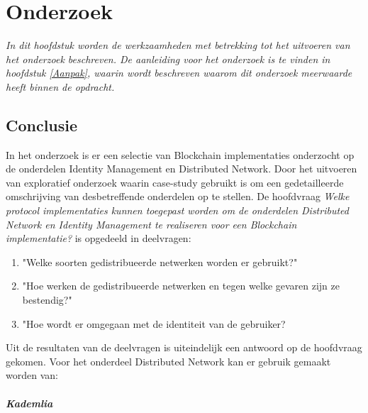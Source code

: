 \chapter{Onderzoek}
\textit{In dit hoofdstuk worden de werkzaamheden met betrekking tot het uitvoeren van het onderzoek beschreven. De aanleiding voor het onderzoek is te vinden in hoofdstuk \ref{Aanpak}, waarin wordt beschreven waarom dit onderzoek meerwaarde heeft binnen de opdracht.}



\newpage


\newpage


\newpage


\newpage


\newpage
\section{Conclusie}

In het onderzoek is er een selectie van Blockchain implementaties onderzocht op de onderdelen Identity Management en Distributed Network. Door het uitvoeren van exploratief onderzoek waarin case-study gebruikt is om een gedetailleerde omschrijving van desbetreffende onderdelen op te stellen. De hoofdvraag \textit{Welke protocol implementaties kunnen toegepast worden om de onderdelen Distributed Network en Identity Management te realiseren voor een Blockchain implementatie?} is opgedeeld in deelvragen:

\begin{enumerate}[noitemsep]
  \item "Welke soorten gedistribueerde netwerken worden er gebruikt?"
  \item "Hoe werken de gedistribueerde netwerken en tegen welke gevaren zijn ze bestendig?"
  \item "Hoe wordt er omgegaan met de identiteit van de gebruiker?
\end{enumerate}

Uit de resultaten van de deelvragen is uiteindelijk een antwoord op de hoofdvraag gekomen. Voor het onderdeel Distributed Network kan er gebruik gemaakt worden van:

\paragraph{Kademlia}

